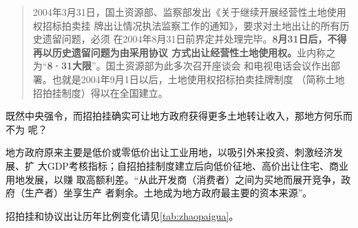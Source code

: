 \begin{quotation}
2004年3月31日，国土资源部、监察部发出《关于继续开展经营性土地使用权招标拍卖挂
牌出让情况执法监察工作的通知》，要求对土地出让的所有历史遗留问题，必须
在2004年8月31日前界定并处理完毕。\textbf{8月31日后，不得再以历史遗留问题为由采用协议
方式出让经营性土地使用权。}业内称之为“\textbf{8·31大限}”。国土资源部为此多次召开座谈会
和电视电话会议作出部署。也就是2004年9月1日以后，土地使用权招标拍卖挂牌制度
（简称土地招拍挂制度）得以在全国建立。
\end{quotation}

既然中央强令，而招拍挂确实可让地方政府获得更多土地转让收入，那地方何乐而不为
呢？

地方政府原来主要是低价或零低价出让工业用地，以吸引外来投资、刺激经济发展、扩
大GDP考核指标；自招拍挂制度建立后向低价征地、高价出让住宅、商业用地发展，以赚
取高额利差。“从此开发商（消费者）之间为买地而展开竞争，政府（生产者）坐享生产
者剩余。土地成为地方政府最主要的资本来源”\cite{dajueqi}。

招拍挂和协议出让历年比例变化请见\cref{tab:zhaopaigua}。
\begin{table}[]
\centering
{}
\caption{不同土地出让方式出让土地面积、收入的构成}
\label{tab:zhaopaigua}
\end{table}

